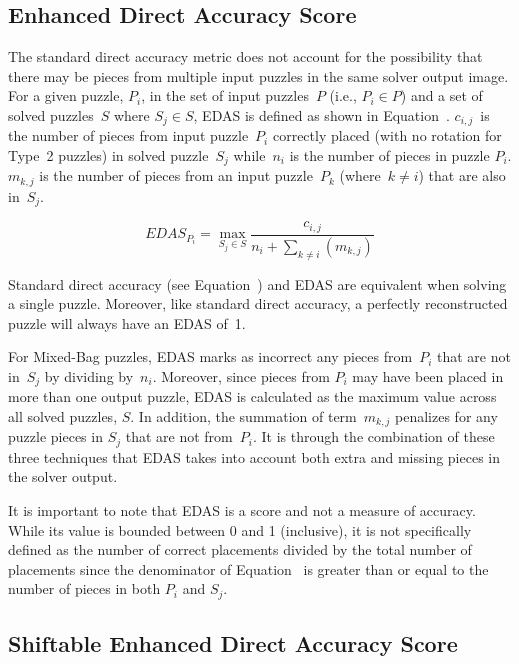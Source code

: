 \subsection{Enhanced Direct Accuracy Score}\label{sec:enhancedDirectAccuracyScore}

The standard direct accuracy metric does not account for the possibility that there may be pieces from multiple input puzzles in the same solver output image.  For a given puzzle, $P_i$, in the set of input puzzles~$P$ (i.e., $P_i \in P$) and a set of solved puzzles~$S$ where $S_j \in S$, EDAS is defined as shown in Equation~.  $c_{i,j}$~is the number of pieces from input puzzle~$P_i$ correctly placed (with no rotation for Type~2 puzzles) in solved puzzle~$S_j$ while~$n_i$ is the number of pieces in puzzle $P_i$. $m_{k,j}$ is the number of pieces from an input puzzle~$P_k$ (where~$k \ne i$) that are also in~$S_j$.

\begin{equation} \label{eq:enhancedDirectAccuracyScore}
  EDAS_{P_i} = \max\limits_{S_j \in S}\frac{c_{i,j}}{n_i + \sum_{k \ne i}(m_{k,j})}
\end{equation}

Standard direct accuracy (see Equation~) and EDAS are equivalent when solving a single puzzle. Moreover, like standard direct accuracy, a perfectly reconstructed puzzle will always have an EDAS of~1. 

For Mixed-Bag puzzles, EDAS marks as incorrect any pieces from~$P_i$ that are not in~$S_j$ by dividing by~$n_i$.  Moreover, since pieces from $P_i$ may have been placed in more than one output puzzle, EDAS is calculated as the maximum value across all solved puzzles, $S$.  In addition, the summation of term~$m_{k,j}$ penalizes for any puzzle pieces in $S_j$ that are not from~$P_i$.  It is through the combination of these three techniques that EDAS takes into account both extra and missing pieces in the solver output.

It is important to note that EDAS is a score and not a measure of accuracy. While its value is bounded between 0 and 1 (inclusive), it is not specifically defined as the number of correct placements divided by the total number of placements since the denominator of Equation~ is greater than or equal to the number of pieces in both $P_i$ and $S_j$.

\subsection{Shiftable Enhanced Direct Accuracy Score}\label{sec:shiftableEnhancedDirectAccuracy}

